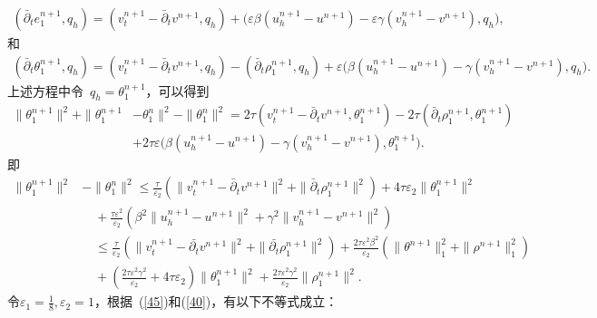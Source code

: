 \documentclass[twoside,UTF8]{nputhesis}
\begin{document}
\begin{equation*}
\begin{split}
(\bar{\partial}_te_1^{n+1},q_h)=(v_t^{n+1}-\bar{\partial}_tv^{n+1},q_h)+\Big(\varepsilon\beta (u_h^{n+1}-u^{n+1})-\varepsilon\gamma (v_h^{n+1}-v^{n+1}),q_h\Big),
\label{42}
\end{split}
\end{equation*}
和
\begin{equation*}
\begin{split}
(\bar{\partial}_t\theta_1^{n+1},q_h)\!=\!(v_t^{n+1}-\bar{\partial}_tv^{n+1},q_h)\!-\!(\bar{\partial}_t\rho_1^{n+1},q_h)\!+\!\varepsilon\Big(\beta (u_h^{n+1}-u^{n+1})\!-\!\gamma (v_h^{n+1}-v^{n+1}),q_h\Big).
\label{43}
\end{split}
\end{equation*}
上述方程中令~$q_h=\theta^{n+1}_1$，可以得到
\begin{equation}
\begin{split}
\| \theta^{n+1}_1\|^2+\| \theta^{n+1}_1&-\theta^n_1\|^2-\| \theta^n_1\|^2=2\tau(v_t^{n+1}-\bar{\partial}_tv^{n+1},\theta^{n+1}_1)-2\tau(\bar{\partial}_t\rho_1^{n+1},\theta^{n+1}_1)\\
&+2\tau\varepsilon\Big(\beta (u_h^{n+1}-u^{n+1})-\gamma (v_h^{n+1}-v^{n+1}),\theta^{n+1}_1\Big).
\label{44}
\end{split}
\end{equation}
即
\begin{equation}
\begin{split}
\| \theta^{n+1}_1\|^2&-\| \theta^n_1\|^2\leq\frac{\tau}{\varepsilon_2}(\| v_t^{n+1}-\bar{\partial}_tv^{n+1}\|^2+\|\bar{\partial}_t\rho_1^{n+1}\|^2)+4\tau\varepsilon_2\| \theta^{n+1}_1\|^2\\
&\quad+\frac{\tau\varepsilon^2}{\varepsilon_2}(\beta ^2 \| u_h^{n+1}-u^{n+1}\|^2+\gamma^2 \| v_h^{n+1}-v^{n+1}\|^2)\\
&\quad\leq\frac{\tau}{\varepsilon_2}(\| v_t^{n+1}-\bar{\partial_t}v^{n+1}\|^2+\| \bar{\partial_t}\rho^{n+1}_1\|^2)+\frac{2\tau\varepsilon^2\beta^2}{\varepsilon_2}(\| \theta^{n+1}\|^2_1+\| \rho^{n+1}\|^2_1)\\
&\quad+(\frac{2\tau\varepsilon^2\gamma^2}{\varepsilon_2}+4\tau\varepsilon_2)\| \theta^{n+1}_1\|^2+\frac{2\tau\varepsilon^2\gamma^2}{\varepsilon_2}\| \rho^{n+1}_1\|^2.
\label{45}
\end{split}
\end{equation}
令$\varepsilon_1=\frac{1}{8}, \varepsilon_2=1$，根据~(\ref{45})和(\ref{40})，有以下不等式成立：
\end{document}
